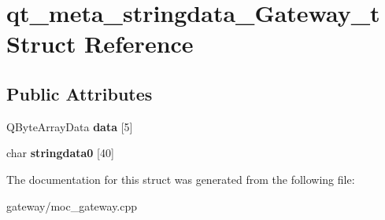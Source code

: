 \hypertarget{structqt__meta__stringdata__Gateway__t}{}\section{qt\+\_\+meta\+\_\+stringdata\+\_\+\+Gateway\+\_\+t Struct Reference}
\label{structqt__meta__stringdata__Gateway__t}
\subsection*{Public Attributes}
\begin{DoxyCompactItemize}
\item 
\mbox{\label{structqt__meta__stringdata__Gateway__t_a59aac66aab36156e656ec1a4b8eb9ea4}} 
Q\+Byte\+Array\+Data {\bfseries data} \mbox{[}5\mbox{]}
\item 
\mbox{\label{structqt__meta__stringdata__Gateway__t_a13180d3b3ab27ef66b034b0d775386b5}} 
char {\bfseries stringdata0} \mbox{[}40\mbox{]}
\end{DoxyCompactItemize}


The documentation for this struct was generated from the following file\+:\begin{DoxyCompactItemize}
\item 
gateway/moc\+\_\+gateway.\+cpp\end{DoxyCompactItemize}
